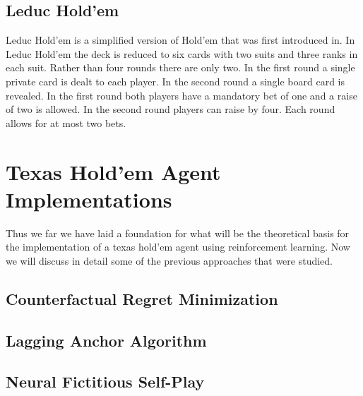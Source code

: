 \subsection{Leduc Hold'em}\label{subsec:leducHoldem}
Leduc Hold'em is a simplified version of Hold'em that was first introduced in\citep{southey2012bayes}.
In Leduc Hold'em the deck is reduced to six cards with two suits and three ranks in each suit.
Rather than four rounds there are only two.
In the first round a single private card is dealt to each player.
In the second round a single board card is revealed.
In the first round both players have a mandatory bet of one and a raise of two is allowed.
In the second round players can raise by four.
Each round allows for at most two bets.

\section{Texas Hold'em Agent Implementations}\label{sec:thImplementations}
Thus we far we have laid a foundation for what will be the theoretical basis for the implementation of a
texas hold'em agent using reinforcement learning.
Now we will discuss in detail some of the previous approaches that were studied.

\subsection{Counterfactual Regret Minimization}\label{subsec:thCFR}

\subsection{Lagging Anchor Algorithm}\label{subsec:thRL}

\subsection{Neural Fictitious Self-Play}\label{subsec:thNFSP}

